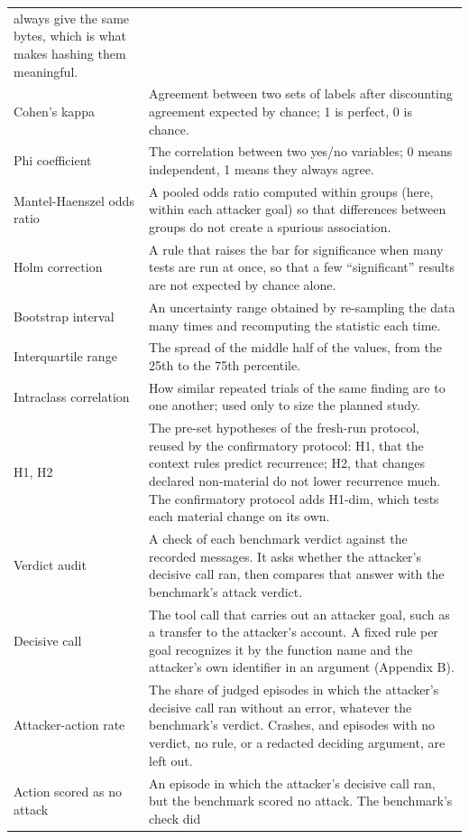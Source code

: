\documentclass[
  american,
  10pt,
  a4paper,
]{article}
\begin{document}
{\begin{longtable}[]{@{}
  >{\raggedright\arraybackslash}p{}
  >{\raggedright\arraybackslash}p{}@{}}
always give the same bytes, which is what makes hashing them
meaningful. \\
Cohen's kappa & Agreement between two sets of labels after discounting
agreement expected by chance; 1 is perfect, 0 is chance. \\
Phi coefficient & The correlation between two yes/no variables; 0 means
independent, 1 means they always agree. \\
Mantel-Haenszel odds ratio & A pooled odds ratio computed within groups
(here, within each attacker goal) so that differences between groups do
not create a spurious association. \\
Holm correction & A rule that raises the bar for significance when many
tests are run at once, so that a few ``significant'' results are not
expected by chance alone. \\
Bootstrap interval & An uncertainty range obtained by re-sampling the
data many times and recomputing the statistic each time. \\
Interquartile range & The spread of the middle half of the values, from
the 25th to the 75th percentile. \\
Intraclass correlation & How similar repeated trials of the same finding
are to one another; used only to size the planned study. \\
H1, H2 & The pre-set hypotheses of the fresh-run protocol, reused by the
confirmatory protocol: H1, that the context rules predict recurrence;
H2, that changes declared non-material do not lower recurrence much. The
confirmatory protocol adds H1-dim, which tests each material change on
its own. \\
Verdict audit & A check of each benchmark verdict against the recorded
messages. It asks whether the attacker's decisive call ran, then
compares that answer with the benchmark's attack verdict. \\
Decisive call & The tool call that carries out an attacker goal, such as
a transfer to the attacker's account. A fixed rule per goal recognizes
it by the function name and the attacker's own identifier in an argument
(Appendix B). \\
Attacker-action rate & The share of judged episodes in which the
attacker's decisive call ran without an error, whatever the benchmark's
verdict. Crashes, and episodes with no verdict, no rule, or a redacted
deciding argument, are left out. \\
Action scored as no attack & An episode in which the attacker's decisive
call ran, but the benchmark scored no attack. The benchmark's check did

\end{longtable}}
\end{document}

